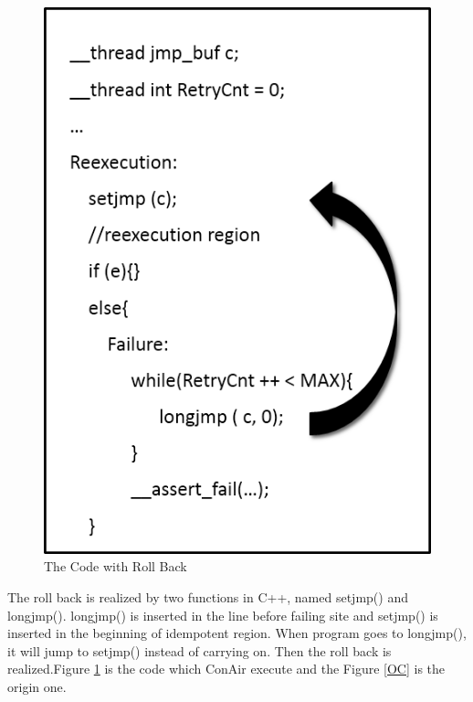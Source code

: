 \begin{figure}
\begin{minipage}[t]{0.5\linewidth}
\includegraphics[width=\textwidth]{body/rollback_2.png}
\caption{The Code with Roll Back}
\label{After OC}
\end{minipage}
\end{figure}
The roll back is realized by two functions in C++, named setjmp() and longjmp(). longjmp() is inserted in the line before failing site and setjmp() is inserted in the beginning of idempotent region. When program goes to longjmp(), it will jump to setjmp() instead of carrying on. Then the roll back is realized.Figure \ref{After OC} is the code which ConAir execute and the Figure \ref{OC} is the origin one.


